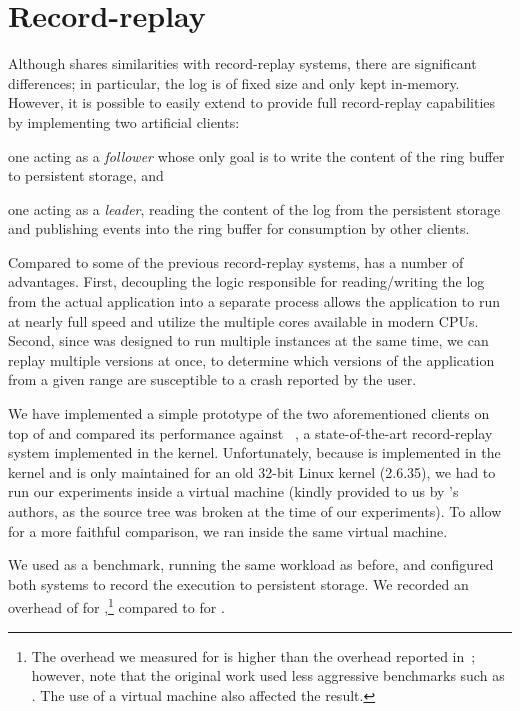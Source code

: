 \section{Record-replay}
\label{sec:record_replay}

Although \varan shares similarities with record-replay systems, there are
significant differences; in particular, the log is of fixed size and
only kept in-memory.  However, it is possible to easily extend \varan to
provide full record-replay capabilities by implementing two artificial
clients:
\begin{inparaenum}[(i)]
\item one acting as a \emph{follower} whose only goal is to write the
  content of the ring buffer to persistent storage, and
\item one acting as a \emph{leader}, reading the content of the log
  from the persistent storage and publishing events into the ring
  buffer for consumption by other clients.
\end{inparaenum}

Compared to some of the previous record-replay systems, \varan has a
number of advantages. First, decoupling the logic responsible for
reading/writing the log from the actual application into a separate
process allows the application to run at nearly full speed and utilize
the multiple cores available in modern CPUs.  Second, since \varan was
designed to run multiple instances at the same time, we can replay
multiple versions at once, \eg to determine which versions of the
application from a given range are susceptible to a crash reported by
the user.

We have implemented a simple prototype of the two aforementioned
clients on top of \varan and compared its performance against
\scribe~\cite{scribe}, a state-of-the-art record-replay system
implemented in the kernel.  Unfortunately, because \scribe is
implemented in the kernel and is only maintained for an old 32-bit
Linux kernel (2.6.35), we had to run our experiments inside a virtual
machine (kindly provided to us by \scribe's authors, as the source tree
was broken at the time of our experiments). 
To allow for a more faithful comparison, we ran \varan inside the same
virtual machine.

We used \redis as a benchmark, running the same workload as before,
and configured both systems to record the execution to persistent
storage.  We recorded an overhead of \redisRROvhScribe for
\scribe,\footnote{The overhead we measured for \scribe is higher than
  the overhead reported in~\cite{scribe}; however, note that the original
  work used less aggressive benchmarks such as \httpd.  The use of a
  virtual machine also affected the result.}  compared to
\redisRROvhNx for \varan.



